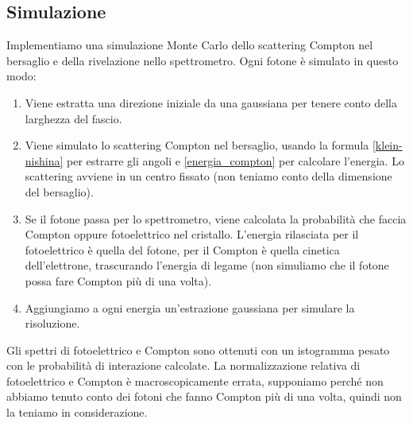 \subsection{Simulazione}

Implementiamo una simulazione Monte Carlo dello scattering Compton nel bersaglio
e della rivelazione nello spettrometro.
Ogni fotone è simulato in questo modo:
\begin{enumerate}
	\item Viene estratta una direzione iniziale da una gaussiana per tenere conto della larghezza del fascio.
	\item Viene simulato lo scattering Compton nel bersaglio,
	usando la formula \eqref{klein-nishina} per estrarre gli angoli e \eqref{energia_compton} per calcolare l'energia.
	Lo scattering avviene in un centro fissato (non teniamo conto della dimensione del bersaglio).
	\item Se il fotone passa per lo spettrometro,
	viene calcolata la probabilità che faccia Compton oppure fotoelettrico nel cristallo.
	L'energia rilasciata per il fotoelettrico è quella del fotone,
	per il Compton è quella cinetica dell'elettrone, trascurando l'energia di legame
	(non simuliamo che il fotone possa fare Compton più di una volta).
	\item Aggiungiamo a ogni energia un'estrazione gaussiana
	per simulare la risoluzione.
\end{enumerate}
Gli spettri di fotoelettrico e Compton sono ottenuti con un istogramma pesato con le probabilità di interazione calcolate.
La normalizzazione relativa di fotoelettrico e Compton è macroscopicamente errata,
supponiamo perché non abbiamo tenuto conto dei fotoni che fanno Compton più di una volta,
quindi non la teniamo in considerazione.